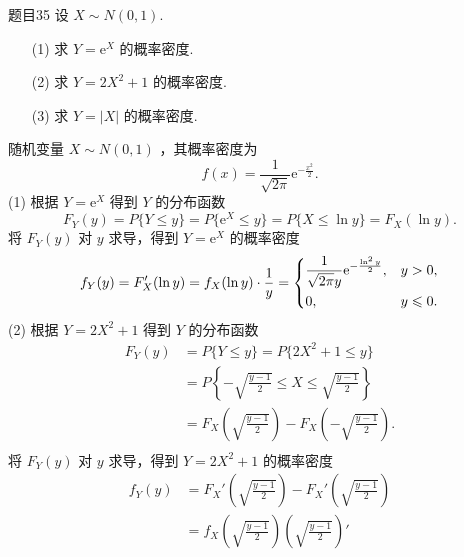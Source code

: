 \begin{question}{题目35}
    设 $X \sim N(0,1)$.
    \begin{itemize}
        \item [(1)] 求 $Y=\mathrm{e}^X$ 的概率密度.
        \item [(2)] 求 $Y=2X^2 + 1$ 的概率密度.
        \item [(3)] 求 $Y=|X|$ 的概率密度.
    \end{itemize}
\end{question}
\begin{solution}
    随机变量 $X \sim N(0,1)$ ，其概率密度为
    $$
        f(x) = \frac{1}{\sqrt{2\pi}}\mathrm{e}^{-\frac{x^2}{2}}.
    $$
    (1) 根据 $Y = \mathrm{e}^X$ 得到 $Y$ 的分布函数
    $$
        F_Y(y)
        = P\{Y \leqslant y\}
        = P\{\mathrm{e}^X \leqslant y\}
        = P\{X \leqslant \ln y\}
        = F_X(\ln{y}).
    $$
    将 $F_Y(y)$ 对 $y$ 求导，得到 $Y=\mathrm{e}^X$ 的概率密度
    $$
        \begin{aligned}
            f_Y(y)
            = F_X'(\ln{y}) = f_X(\ln{y})\cdot\frac{1}{y}
            = \begin{dcases}
                  \frac{1}{\sqrt{2\pi}y}\mathrm{e}^{-\frac{\ln^2y}{2}}, & y > 0,         \\
                  0 ,                                                   & y \leqslant 0.
              \end{dcases}
        \end{aligned}
    $$
    (2) 根据 $Y=2X^2+1$ 得到 $Y$ 的分布函数
    $$
        \begin{aligned}
            F_Y(y)
             & = P\{Y \leqslant y\} = P\{2X^2+1 \leqslant y\}                                     \\
             & = P\left\{-\sqrt{\frac{y-1}{2}} \leqslant X \leqslant \sqrt{\frac{y-1}{2}}\right\} \\
             & = F_X\left(\sqrt{\frac{y-1}{2}}\right) - F_X\left(-\sqrt{\frac{y-1}{2}}\right).    \\
        \end{aligned}
    $$
    将 $F_Y(y)$ 对 $y$ 求导，得到 $Y = 2X^2+1$ 的概率密度
    $$
        \begin{aligned}
            f_Y(y)
             & = F_X'\left(\sqrt{\frac{y-1}{2}}\right)
            - F_X'\left(\sqrt{\frac{y-1}{2}}\right)                                              \\
             & = f_X\left(\sqrt{\frac{y-1}{2}}\right)\left(\sqrt{\frac{y-1}{2}}\right)'

\end{aligned}$$
\end{solution}
